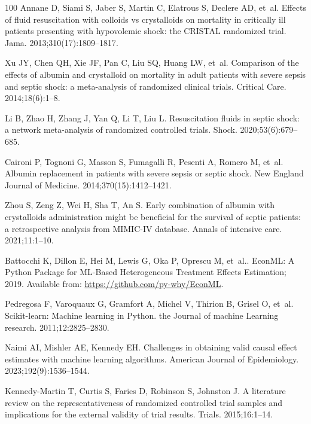 \documentclass[10pt,letterpaper]{article}
\begin{document}
\begin{thebibliography}{100}
  Annane D, Siami S, Jaber S, Martin C, Elatrous S, Declere AD, et~al.
  \newblock Effects of fluid resuscitation with colloids vs crystalloids on mortality in critically ill patients presenting with hypovolemic shock: the CRISTAL randomized trial.
  \newblock Jama. 2013;310(17):1809--1817.

  Xu JY, Chen QH, Xie JF, Pan C, Liu SQ, Huang LW, et~al.
  \newblock Comparison of the effects of albumin and crystalloid on mortality in adult patients with severe sepsis and septic shock: a meta-analysis of randomized clinical trials.
  \newblock Critical Care. 2014;18(6):1--8.

  Li B, Zhao H, Zhang J, Yan Q, Li T, Liu L.
  \newblock Resuscitation fluids in septic shock: a network meta-analysis of randomized controlled trials.
  \newblock Shock. 2020;53(6):679--685.

  Caironi P, Tognoni G, Masson S, Fumagalli R, Pesenti A, Romero M, et~al.
  \newblock Albumin replacement in patients with severe sepsis or septic shock.
  \newblock New England Journal of Medicine. 2014;370(15):1412--1421.

  Zhou S, Zeng Z, Wei H, Sha T, An S.
  \newblock Early combination of albumin with crystalloids administration might be beneficial for the survival of septic patients: a retrospective analysis from MIMIC-IV database.
  \newblock Annals of intensive care. 2021;11:1--10.

  Battocchi K, Dillon E, Hei M, Lewis G, Oka P, Oprescu M, et~al.. {EconML}: {A Python Package for ML-Based Heterogeneous Treatment Effects Estimation}; 2019.
  \newblock Available from: \url{https://github.com/py-why/EconML}.

  Pedregosa F, Varoquaux G, Gramfort A, Michel V, Thirion B, Grisel O, et~al.
  \newblock Scikit-learn: Machine learning in Python.
  \newblock the Journal of machine Learning research. 2011;12:2825--2830.

  Naimi AI, Mishler AE, Kennedy EH.
  \newblock Challenges in obtaining valid causal effect estimates with machine learning algorithms.
  \newblock American Journal of Epidemiology. 2023;192(9):1536--1544.

  Kennedy-Martin T, Curtis S, Faries D, Robinson S, Johnston J.
  \newblock A literature review on the representativeness of randomized controlled trial samples and implications for the external validity of trial results.
  \newblock Trials. 2015;16:1--14.


\end{thebibliography}
\end{document}
